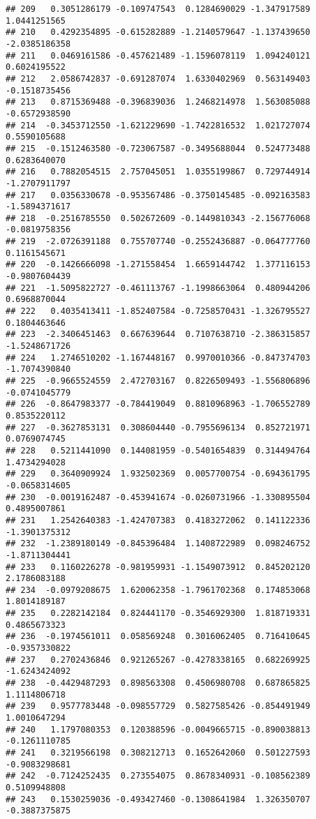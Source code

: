 \documentclass[
]{article}
\begin{document}
\begin{verbatim}
## 209   0.3051286179 -0.109747543  0.1284690029 -1.347917589  1.0441251565
## 210   0.4292354895 -0.615282889 -1.2140579647 -1.137439650 -2.0385186358
## 211   0.0469161586 -0.457621489 -1.1596078119  1.094240121  0.6024195522
## 212   2.0586742837 -0.691287074  1.6330402969  0.563149403 -0.1518735456
## 213   0.8715369488 -0.396839036  1.2468214978  1.563085088 -0.6572938590
## 214  -0.3453712550 -1.621229690 -1.7422816532  1.021727074  0.5590105688
## 215  -0.1512463580 -0.723067587 -0.3495688044  0.524773488  0.6283640070
## 216   0.7882054515  2.757045051  1.0355199867  0.729744914 -1.2707911797
## 217   0.0356330678 -0.953567486 -0.3750145485 -0.092163583 -1.5894371617
## 218  -0.2516785550  0.502672609 -0.1449810343 -2.156776068 -0.0819758356
## 219  -2.0726391188  0.755707740 -0.2552436887 -0.064777760  0.1161545671
## 220  -0.1426666098 -1.271558454  1.6659144742  1.377116153 -0.9807604439
## 221  -1.5095822727 -0.461113767 -1.1998663064  0.480944206  0.6968870044
## 222   0.4035413411 -1.852407584 -0.7258570431 -1.326795527  0.1804463646
## 223  -2.3406451463  0.667639644  0.7107638710 -2.386315857 -1.5248671726
## 224   1.2746510202 -1.167448167  0.9970010366 -0.847374703 -1.7074390840
## 225  -0.9665524559  2.472703167  0.8226509493 -1.556806896 -0.0741045779
## 226  -0.8647983377 -0.784419049  0.8810968963 -1.706552789  0.8535220112
## 227  -0.3627853131  0.308604440 -0.7955696134  0.852721971  0.0769074745
## 228   0.5211441090  0.144081959 -0.5401654839  0.314494764  1.4734294028
## 229   0.3640909924  1.932502369  0.0057700754 -0.694361795 -0.0658314605
## 230  -0.0019162487 -0.453941674 -0.0260731966 -1.330895504  0.4895007861
## 231   1.2542640383 -1.424707383  0.4183272062  0.141122336 -1.3901375312
## 232  -1.2389180149 -0.845396484  1.1408722989  0.098246752 -1.8711304441
## 233   0.1160226278 -0.981959931 -1.1549073912  0.845202120  2.1786083188
## 234  -0.0979208675  1.620062358 -1.7961702368  0.174853068  1.8014189187
## 235   0.2282142184  0.824441170 -0.3546929300  1.818719331  0.4865673323
## 236  -0.1974561011  0.058569248  0.3016062405  0.716410645 -0.9357330822
## 237   0.2702436846  0.921265267 -0.4278338165  0.682269925 -1.6243424092
## 238  -0.4429487293  0.898563308  0.4506980708  0.687865825  1.1114806718
## 239   0.9577783448 -0.098557729  0.5827585426 -0.854491949  1.0010647294
## 240   1.1797080353  0.120388596 -0.0049665715 -0.890038813 -0.1261110785
## 241   0.3219566198  0.308212713  0.1652642060  0.501227593 -0.9083298681
## 242  -0.7124252435  0.273554075  0.8678340931 -0.108562389  0.5109948808
## 243   0.1530259036 -0.493427460 -0.1308641984  1.326350707 -0.3887375875

\end{verbatim}
\end{document}
